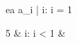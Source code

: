 \begin{eqcode}{e}{a }{}{}
  a_i | i: i = 1 \gets  
  \begin{cases}
    5 & i: i < 1  & \otherwise \lend %
  \end{cases} \lend
\end{eqcode}

